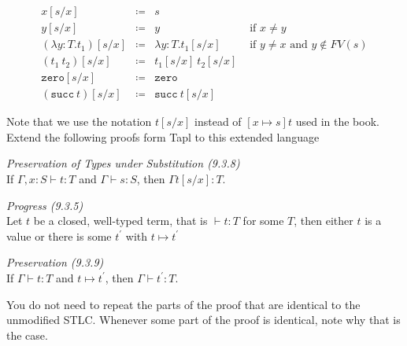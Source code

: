 \begin{minipage}{\textwidth}
  \begin{minipage}{0.5\textwidth}
    \begin{prooftree}
    \end{prooftree}
  \end{minipage}
  \hfill
  \begin{minipage}{0.4\textwidth}
    \begin{prooftree}
    \end{prooftree}
  \end{minipage}
  \hfill
\end{minipage}
\hfill

\begin{minipage}{\textwidth}
  \vspace{2em}
  \[
    \begin{array}{lcrr }
      x[s/x] & \coloneq & s\\
      y[s/x] & \coloneq & y & \text{ if } x\neq y\\
      (\lambda y:T.t_1)[s/x] & \coloneq & \lambda y:T. t_1[s/x] & \text{ if } y\neq x \text{ and } y\notin FV(s)\\
      (t_1\ t_2)[s/x] & \coloneq & t_1[s/x]\ t_2[s/x]\\
      \mathtt{zero}[s/x] & \coloneq & \mathtt{zero}\\
      (\mathtt{succ}\ t)[s/x] & \coloneq & \mathtt{succ}\ t[s/x]
    \end{array}
  \]
  \hfill \vspace{1em}
\end{minipage}
Note that we use the notation $t[s/x]$ instead of $[x\mapsto s]t$ used in the book.\\
Extend the following proofs form Tapl to this extended language

\begin{theorem}\emph{Preservation of Types under Substitution (9.3.8)}\\
  If $\Gamma, x:S\vdash t:T$ and $\Gamma \vdash s:S$, then $\Gamma t[s/x]:T$.
\end{theorem}
\begin{theorem}\emph{Progress (9.3.5)}\\
  Let $t$ be a closed, well-typed term, that is $\vdash t:T$ for some $T$, then either $t$ is a value or there is some $t^{\prime}$ with $t\mapsto t^{\prime}$
\end{theorem}
\begin{theorem}\emph{Preservation (9.3.9)}\\
  If $\Gamma\vdash t:T$ and $t\mapsto t^{\prime}$, then $\Gamma \vdash t^{\prime}:T$.
\end{theorem}
You do not need to repeat the parts of the proof that are identical to the unmodified STLC.
Whenever some part of the proof is identical, note why that is the case.

